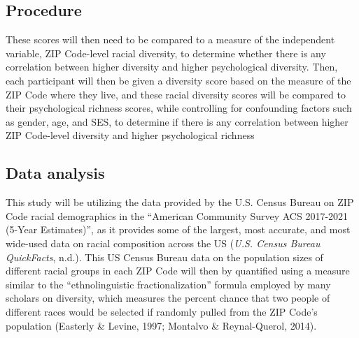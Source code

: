 \documentclass[
  man,floatsintext]{apa7}
\begin{document}
\hypertarget{procedure}{%
\subsection{Procedure}\label{procedure}}

These scores will then need to be compared to a measure of the independent variable, ZIP Code-level racial diversity, to determine whether there is any correlation between higher diversity and higher psychological diversity. Then, each participant will then be given a diversity score based on the measure of the ZIP Code where they live, and these racial diversity scores will be compared to their psychological richness scores, while controlling for confounding factors such as gender, age, and SES, to determine if there is any correlation between higher ZIP Code-level diversity and higher psychological richness

\hypertarget{data-analysis}{%
\subsection{Data analysis}\label{data-analysis}}

This study will be utilizing the data provided by the U.S. Census Bureau on ZIP Code racial demographics in the ``American Community Survey ACS 2017-2021 (5-Year Estimates)'', as it provides some of the largest, most accurate, and most wide-used data on racial composition across the US (\emph{U.{S}. {Census Bureau QuickFacts}}, n.d.). This US Census Bureau data on the population sizes of different racial groups in each ZIP Code will then by quantified using a measure similar to the ``ethnolinguistic fractionalization'' formula employed by many scholars on diversity, which measures the percent chance that two people of different races would be selected if randomly pulled from the ZIP Code's population (Easterly \& Levine, 1997; Montalvo \& Reynal-Querol, 2014).
\end{document}
